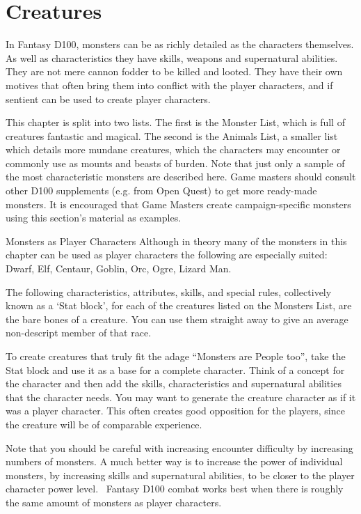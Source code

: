 \chapter{Creatures}
\label{ch:creatures}

In Fantasy D100, monsters can be as richly detailed as the characters themselves. As well as characteristics they have skills, weapons and supernatural abilities. They are not mere cannon fodder to be killed and looted. They have their own motives that often bring them into conflict with the player characters, and if sentient can be used to create player characters.

This chapter is split into two lists. The first is the Monster List, which is full of creatures fantastic and magical. The second is the Animals List, a smaller list which details more mundane creatures, which the characters may encounter or commonly use as mounts and beasts of burden. Note that just only a sample of the most characteristic monsters are described here. Game masters should consult other D100 supplements (e.g. from Open Quest) to get more ready-made monsters. It is encouraged that Game Masters create campaign-specific monsters using this section's material as examples.
\vspace{1em}

\begin{rpg-titlebox}{Monsters as Player Characters}
Although in theory many of the monsters in this chapter can be used as player characters the following are especially suited: Dwarf, Elf, Centaur, Goblin, Orc, Ogre, Lizard Man.
\end{rpg-titlebox}
  
The following characteristics, attributes, skills, and special rules, collectively known as a ‘Stat block’, for each of the creatures listed on the Monsters List, are the bare bones of a creature. You can use them straight away to give an average non-descript member of that race.

To create creatures that truly fit the adage “Monsters are People too”, take the Stat block and use it as a base for a complete character. Think of a concept for the character and then add the skills, characteristics and supernatural abilities that the character needs. You may want to generate the creature character as if it was a player character. This often creates good opposition for the players, since the creature will be of comparable experience. 

Note that you should be careful with increasing encounter difficulty by increasing numbers of monsters. A much better way is to increase the power of individual monsters, by increasing skills and supernatural abilities, to be closer to the player character power level.  Fantasy D100 combat works best when there is roughly the same amount of monsters as player characters.

